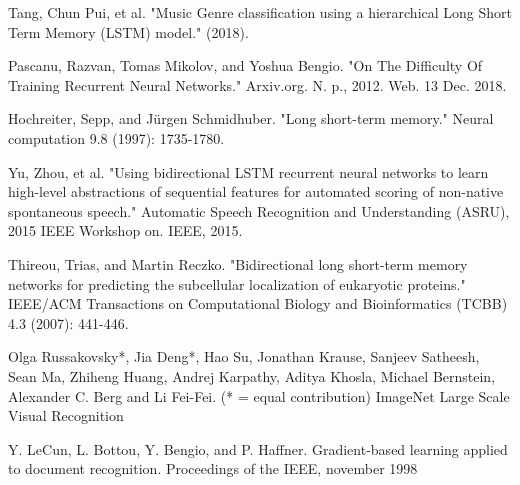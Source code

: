 \documentclass[letterpaper, 10 pt, conference]{ieeeconf}  %
\begin{document}
\begin{thebibliography}{99}
 Tang, Chun Pui, et al. "Music Genre classification using a hierarchical Long Short Term Memory (LSTM) model." (2018).

 Pascanu, Razvan, Tomas Mikolov, and Yoshua Bengio. "On The Difficulty Of Training Recurrent Neural Networks." Arxiv.org. N. p., 2012. Web. 13 Dec. 2018.

 Hochreiter, Sepp, and Jürgen Schmidhuber. "Long short-term memory." Neural computation 9.8 (1997): 1735-1780.

 Yu, Zhou, et al. "Using bidirectional LSTM recurrent neural networks to learn high-level abstractions of sequential features for automated scoring of non-native spontaneous speech." Automatic Speech Recognition and Understanding (ASRU), 2015 IEEE Workshop on. IEEE, 2015.

 Thireou, Trias, and Martin Reczko. "Bidirectional long short-term memory networks for predicting the subcellular localization of eukaryotic proteins." IEEE/ACM Transactions on Computational Biology and Bioinformatics (TCBB) 4.3 (2007): 441-446.

 Olga Russakovsky*, Jia Deng*, Hao Su, Jonathan Krause, Sanjeev Satheesh, Sean Ma, Zhiheng Huang, Andrej Karpathy, Aditya Khosla, Michael Bernstein, Alexander C. Berg and Li Fei-Fei. (* = equal contribution) ImageNet Large Scale Visual Recognition 

 Y. LeCun, L. Bottou, Y. Bengio, and P. Haffner. Gradient-based learning applied to document recognition. Proceedings of the IEEE, november 1998

\end{thebibliography}
\end{document}
